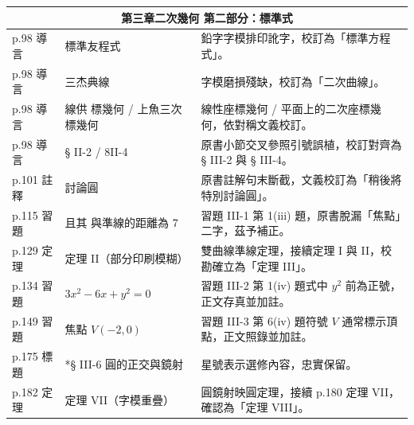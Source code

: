 \documentclass[a4paper,12pt,twoside]{article}
\begin{document}
\begin{table}[H]
\begin{tabularx}{\textwidth}{|p{3.0cm}|p{3.8cm}|X|}
\multicolumn{3}{|c|}{\textbf{第三章\quad 二次幾何 第二部分：標準式}} \\ \hline

p.98 導言 & 標準友程式 & 鉛字字模排印訛字，校訂為「標準方程式」。 \\ \hline
p.98 導言 & 三杰典線 & 字模磨損殘缺，校訂為「二次曲線」。 \\ \hline
p.98 導言 & 線供 標幾何 / 上魚三次標幾何 & 線性座標幾何 / 平面上的二次座標幾何，依對稱文義校訂。 \\ \hline
p.98 導言 & § II-2 / 8II-4 & 原書小節交叉參照引號誤植，校訂對齊為 § III-2 與 § III-4。 \\ \hline
p.101 註釋 & 討論圓 & 原書註解句末斷截，文義校訂為「稍後將特別討論圓」。 \\ \hline
p.115 習題 & 且其 與準線的距離為 7 & 習題 III-1 第 1(iii) 題，原書脫漏「焦點」二字，茲予補正。 \\ \hline
p.129 定理 & 定理 II（部分印刷模糊） & 雙曲線準線定理，接續定理 I 與 II，校勘確立為「定理 III」。 \\ \hline
p.134 習題 & $3x^2 - 6x + y^2 = 0$ & 習題 III-2 第 1(iv) 題式中 $y^2$ 前為正號，正文存真並加註。 \\ \hline
p.149 習題 & 焦點 $V(-2,0)$ & 習題 III-3 第 6(iv) 題符號 $V$ 通常標示頂點，正文照錄並加註。 \\ \hline
p.175 標題 & *§ III-6 圓的正交與鏡射 & 星號表示選修內容，忠實保留。 \\ \hline
p.182 定理 & 定理 VII（字模重疊） & 圓鏡射映圓定理，接續 p.180 定理 VII，確認為「定理 VIII」。 \\ \hline

\end{tabularx}
\end{table}
\end{document}
